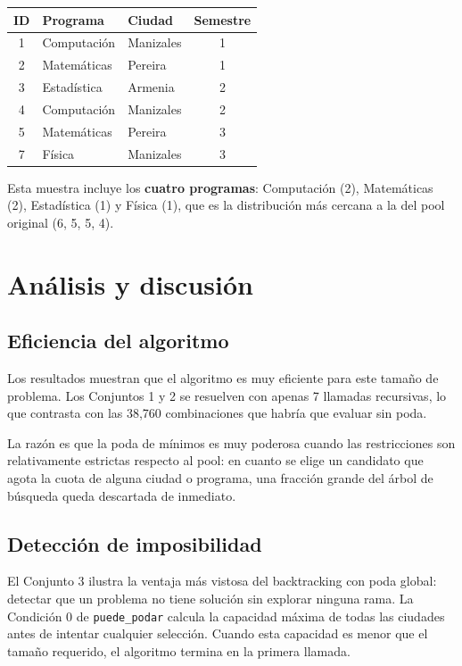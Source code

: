 \documentclass[12pt, a4paper]{article}
\begin{document}
\begin{center}
\begin{tabular}{cllc}
  \toprule
  \textbf{ID} & \textbf{Programa} & \textbf{Ciudad} & \textbf{Semestre} \\
  \midrule
   1 & Computación & Manizales & 1 \\
   2 & Matemáticas & Pereira   & 1 \\
   3 & Estadística & Armenia   & 2 \\
   4 & Computación & Manizales & 2 \\
   5 & Matemáticas & Pereira   & 3 \\
   7 & Física      & Manizales & 3 \\
  \bottomrule
\end{tabular}
\end{center}

Esta muestra incluye los \textbf{cuatro programas}: Computación (2), Matemáticas (2), Estadística (1) y Física (1), que es la distribución más cercana a la del pool original (6, 5, 5, 4).

\section{Análisis y discusión}

\subsection{Eficiencia del algoritmo}

Los resultados muestran que el algoritmo es muy eficiente para este tamaño de problema. Los Conjuntos 1 y 2 se resuelven con apenas 7 llamadas recursivas, lo que contrasta con las 38,760 combinaciones que habría que evaluar sin poda.

La razón es que la poda de mínimos es muy poderosa cuando las restricciones son relativamente estrictas respecto al pool: en cuanto se elige un candidato que agota la cuota de alguna ciudad o programa, una fracción grande del árbol de búsqueda queda descartada de inmediato.

\subsection{Detección de imposibilidad}

El Conjunto 3 ilustra la ventaja más vistosa del backtracking con poda global: detectar que un problema no tiene solución sin explorar ninguna rama. La Condición 0 de \texttt{puede\_podar} calcula la capacidad máxima de todas las ciudades antes de intentar cualquier selección. Cuando esta capacidad es menor que el tamaño requerido, el algoritmo termina en la primera llamada.
\end{document}
